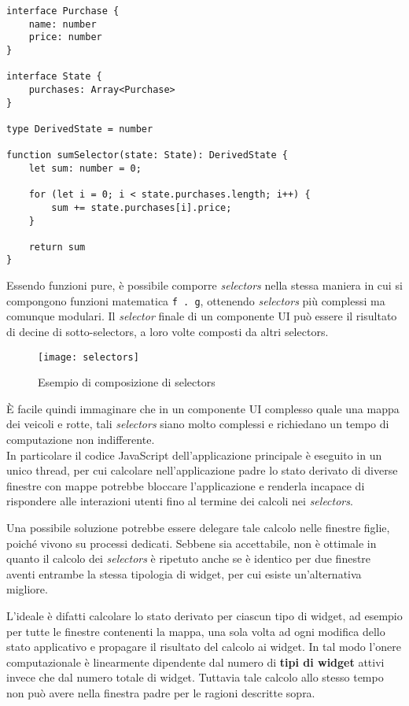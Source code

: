 \begin{lstlisting}
interface Purchase {
    name: number
    price: number
}

interface State {
    purchases: Array<Purchase>
}

type DerivedState = number

function sumSelector(state: State): DerivedState {
    let sum: number = 0;

    for (let i = 0; i < state.purchases.length; i++) {
        sum += state.purchases[i].price;
    }

    return sum
}
\end{lstlisting}

Essendo funzioni pure, è possibile comporre \textit{selectors} nella stessa maniera in cui si compongono funzioni matematica \texttt{f . g}, ottenendo \textit{selectors} più complessi ma comunque modulari. Il \textit{selector} finale di un componente UI può essere il risultato di decine di sotto-selectors, a loro volte composti da altri selectors.

\begin{figure}[H] 
  \centering 
  \texttt{[image: selectors]} 
  \caption{Esempio di composizione di selectors}
\end{figure}

È facile quindi immaginare che in un componente UI complesso quale una mappa dei veicoli e rotte, tali \textit{selectors} siano molto complessi e richiedano un tempo di computazione non indifferente. \\

In particolare il codice JavaScript dell'applicazione principale è eseguito in un unico thread, per cui calcolare nell'applicazione padre lo stato derivato di diverse finestre con mappe potrebbe bloccare l'applicazione e renderla incapace di rispondere alle interazioni utenti fino al termine dei calcoli nei \textit{selectors}. 

Una possibile soluzione potrebbe essere delegare tale calcolo nelle finestre figlie, poiché vivono su processi dedicati. Sebbene sia accettabile, non è ottimale in quanto il calcolo dei \textit{selectors} è ripetuto anche se è identico per due finestre aventi entrambe la stessa tipologia di widget, per cui esiste un'alternativa migliore.

L'ideale è difatti calcolare lo stato derivato per ciascun tipo di widget, ad esempio per tutte le finestre contenenti la mappa, una sola volta ad ogni modifica dello stato applicativo e propagare il risultato del calcolo ai widget. In tal modo l'onere computazionale è linearmente dipendente dal numero di \textbf{tipi di widget} attivi invece che dal numero totale di widget. Tuttavia tale calcolo allo stesso tempo non può avere nella finestra padre per le ragioni descritte sopra.


